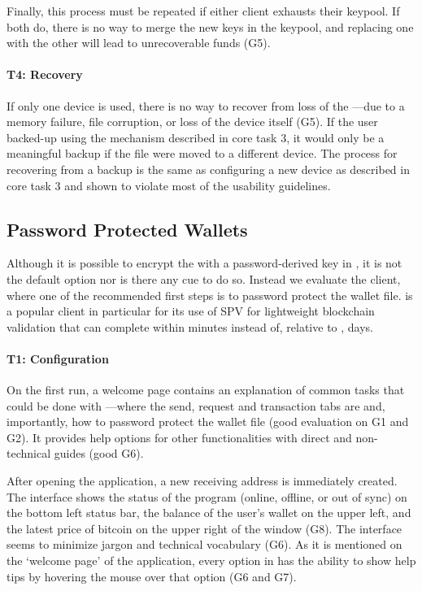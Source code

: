 Finally, this process must be repeated if either client exhausts their keypool. If both do, there is no way to merge the new keys in the keypool, and replacing one \walletfile with the other will lead to unrecoverable funds (G5). 

\paragraph{T4: Recovery} 

If only one device is used, there is no way to recover from loss of the \walletfile---\eg due to a memory failure, file corruption, or loss of the device itself (G5). If the user backed-up \walletfile using the mechanism described in core task 3, it would only be a meaningful backup if the file were moved to a different device. The process for recovering from a backup is the same as configuring a new device as described in core task 3 and shown to violate most of the usability guidelines.


\subsection{Password Protected Wallets}

Although it is possible to encrypt the \walletfile with a password-derived key in \bitcoinclient, it is not the default option nor is there any cue to do so. Instead we evaluate the \multibit client, where one of the recommended first steps is to password protect the wallet file. \multibit is a popular client in particular for its use of SPV for lightweight blockchain validation that can complete within minutes instead of, relative to \bitcoinclient, days.

\paragraph{T1: Configuration} 

On the first run, a welcome page contains an explanation of common tasks that could be done with \multibit---where the send, request and transaction tabs are and, importantly, how to password protect the wallet file (good evaluation on G1 and G2). It provides help options for other functionalities with direct and non-technical guides (good G6). 

After opening the application, a new receiving address is immediately created. The interface shows the status of the program (online, offline, or out of sync) on the bottom left status bar, the balance of the user's wallet on the upper left, and the latest price of bitcoin on the upper right of the window (G8). The interface seems to minimize jargon and technical vocabulary (G6). As it is mentioned on the `welcome page' of the application, every option in \multibit has the ability to show help tips by hovering the mouse over that option (G6 and G7).

